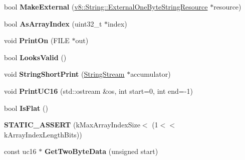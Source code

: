 \begin{DoxyCompactItemize}
\item 
bool {\bfseries Make\+External} (\hyperlink{classv8_1_1_string_1_1_external_one_byte_string_resource}{v8\+::\+String\+::\+External\+One\+Byte\+String\+Resource} $\ast$resource)\hypertarget{classv8_1_1internal_1_1_string_a649997bb50673e4d42ef7ddca0543439}{}\label{classv8_1_1internal_1_1_string_a649997bb50673e4d42ef7ddca0543439}

\item 
bool {\bfseries As\+Array\+Index} (uint32\+\_\+t $\ast$index)\hypertarget{classv8_1_1internal_1_1_string_ac7d26984c3671ba8b7238b4b6df9ec15}{}\label{classv8_1_1internal_1_1_string_ac7d26984c3671ba8b7238b4b6df9ec15}

\item 
void {\bfseries Print\+On} (F\+I\+LE $\ast$out)\hypertarget{classv8_1_1internal_1_1_string_a13c247344e2d0ad2f85f97884dc7e789}{}\label{classv8_1_1internal_1_1_string_a13c247344e2d0ad2f85f97884dc7e789}

\item 
bool {\bfseries Looks\+Valid} ()\hypertarget{classv8_1_1internal_1_1_string_a8d7708a3d1b99d34cb0bd52a80ae5e06}{}\label{classv8_1_1internal_1_1_string_a8d7708a3d1b99d34cb0bd52a80ae5e06}

\item 
void {\bfseries String\+Short\+Print} (\hyperlink{classv8_1_1internal_1_1_string_stream}{String\+Stream} $\ast$accumulator)\hypertarget{classv8_1_1internal_1_1_string_a01a2a3b88a627a1759ec18185c6d3b8f}{}\label{classv8_1_1internal_1_1_string_a01a2a3b88a627a1759ec18185c6d3b8f}

\item 
void {\bfseries Print\+U\+C16} (std\+::ostream \&os, int start=0, int end=-\/1)\hypertarget{classv8_1_1internal_1_1_string_aea55a02f85df72a16ca12a02cff5cd2b}{}\label{classv8_1_1internal_1_1_string_aea55a02f85df72a16ca12a02cff5cd2b}

\item 
bool {\bfseries Is\+Flat} ()\hypertarget{classv8_1_1internal_1_1_string_a67b81848ea2df3c46e3ff2af9148317e}{}\label{classv8_1_1internal_1_1_string_a67b81848ea2df3c46e3ff2af9148317e}

\item 
{\bfseries S\+T\+A\+T\+I\+C\+\_\+\+A\+S\+S\+E\+RT} (k\+Max\+Array\+Index\+Size$<$ (1$<$$<$ k\+Array\+Index\+Length\+Bits))\hypertarget{classv8_1_1internal_1_1_string_af976812addc047f93ea4ae9ff1bd6ec4}{}\label{classv8_1_1internal_1_1_string_af976812addc047f93ea4ae9ff1bd6ec4}

\item 
const uc16 $\ast$ {\bfseries Get\+Two\+Byte\+Data} (unsigned start)\hypertarget{classv8_1_1internal_1_1_string_a12c3771404ad73cbc9316a81f1d6aa98}{}\label{classv8_1_1internal_1_1_string_a12c3771404ad73cbc9316a81f1d6aa98}


\end{DoxyCompactItemize}

